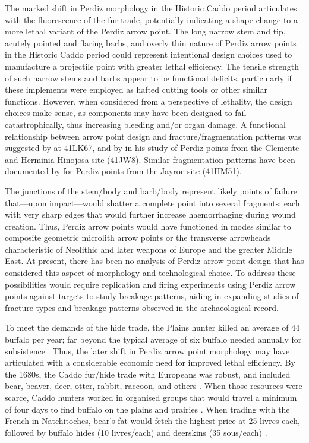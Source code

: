 \documentclass[review]{elsarticle}
\begin{document}
The marked shift in Perdiz morphology in the Historic Caddo period articulates with the fluorescence of the fur trade, potentially indicating a shape change to a more lethal variant of the Perdiz arrow point. The long narrow stem and tip, acutely pointed and flaring barbs, and overly thin nature of Perdiz arrow points in the Historic Caddo period could represent intentional design choices used to manufacture a projectile point with greater lethal efficiency. The tensile strength of such narrow stems and barbs appear to be functional deficits, particularly if these implements were employed as hafted cutting tools or other similar functions. However, when considered from a perspective of lethality, the design choices make sense, as components may have been designed to fail catastrophically, thus increasing bleeding and/or organ damage. A functional relationship between arrow point design and fracture/fragmentation patterns was suggested by \citet{RN9009} at 41LK67, and by \citet{RN9008} in his study of Perdiz points from the Clemente and Herminia Hinojosa site (41JW8). Similar fragmentation patterns have been documented by \citet{RN8999} for Perdiz points from the Jayroe site (41HM51).

The junctions of the stem/body and barb/body represent likely points of failure that---upon impact---would shatter a complete point into several fragments; each with very sharp edges that would further increase haemorrhaging during wound creation. Thus, Perdiz arrow points would have functioned in modes similar to composite geometric microlith arrow points or the transverse arrowheads characteristic of Neolithic and later weapons of Europe and the greater Middle East. At present, there has been no analysis of Perdiz arrow point design that has considered this aspect of morphology and technological choice. To address these possibilities would require replication and firing experiments using Perdiz arrow points against targets to study breakage patterns, aiding in expanding studies of fracture types and breakage patterns observed in the archaeological record.

To meet the demands of the hide trade, the Plains hunter killed an average of 44 buffalo per year; far beyond the typical average of six buffalo needed annually for subsistence \citep{RN39}. Thus, the later shift in Perdiz arrow point morphology may have articulated with a considerable economic need for improved lethal efficiency. By the 1680s, the Caddo fur/hide trade with Europeans was robust, and included bear, beaver, deer, otter, rabbit, raccoon, and others \citep{RN9005,RN39,RN8076}. When those resources were scarce, Caddo hunters worked in organised groups that would travel a minimum of four days to find buffalo on the plains and prairies \citep{RN9005,RN38}. When trading with the French in Natchitoches, bear's fat would fetch the highest price at 25 livres each, followed by buffalo hides (10 livres/each) and deerskins (35 sous/each) \citep{RN9005}.
\end{document}

